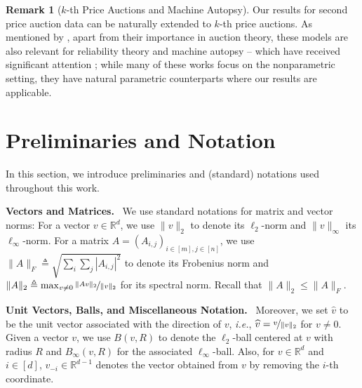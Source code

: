\documentclass[11pt,letterpaper]{article}
\theoremstyle{plain}
\theoremstyle{definition}
\newtheorem{remark}[theorem]{Remark}
\theoremstyle{remark}
\newcommand{\R}{\mathbb{R}}
\newcommand{\nfrac}[2]{\nicefrac{#1}{#2}}
\newcommand{\wh}[1]{\widehat{#1}}
\renewcommand{\paragraph}[1]{\medskip \noindent\textbf{#1}~}
\newcommand{\ie}{\emph{i.e.}}
\begin{document}
{ 

\begin{remark}[{$k$-th Price Auctions and Machine Autopsy}]
\label{rem:reliability}
Our results for second price auction data can be naturally extended to $k$-th price auctions. 
As mentioned by \cite{cherapanamjeri2022auctionEstimation}, {apart from their importance in auction theory,} these models are {also relevant for} reliability theory and machine autopsy -- which have received significant attention \cite{meilijson1981autopsy,antoine1993identifiability,nowik1990identifiability,gertsbakh1988statistical}; 
{while many of these works focus on the nonparametric setting,
they have natural parametric counterparts where our results are applicable}.
\end{remark}



    
                 
     
\section{Preliminaries {and Notation}}
    {In this section, we introduce preliminaries and (standard) notations used throughout this work.}

\paragraph{Vectors and Matrices.}
We use standard notations for matrix and vector norms:
For a vector $v \in \R^d$, we use $\|v\|_2$ to denote its $\ell_2$-norm and $\|v\|_\infty$ its $\ell_\infty$-norm.
For a matrix $A = (A_{i,j})_{i \in [m], j \in [n]}$, we use $\|A\|_F \triangleq \sqrt{\sum_{i} \sum_{j} |A_{i,j}|^2}$ to denote its Frobenius norm and $\|A\|_2 \triangleq \max_{v \neq 0} \nfrac{\|A v\|_2}{\|v\|_2}$ for its spectral norm. Recall that $\|A\|_2 \leq \|A\|_F.$

\paragraph{Unit Vectors, Balls, and Miscellaneous Notation.}
Moreover, we set $\wh{v}$ to be the unit vector associated with the direction of $v$, \ie{}, $\wh{v} = \nfrac{v}{\|v\|_2}$ for $v \neq 0.$
Given a vector $v$, we use $B(v,R)$ to denote the $\ell_2$-ball centered at $v$ with radius $R$ and $B_{\infty}(v,R)$ for the associated $\ell_\infty$-ball.
Also, for $v\in \R^d$ and $i\in [d]$,
$v_{-i}\in \R^{d-1}$ denotes the vector obtained from $v$ by removing the $i$-th coordinate.


}
\end{document}
